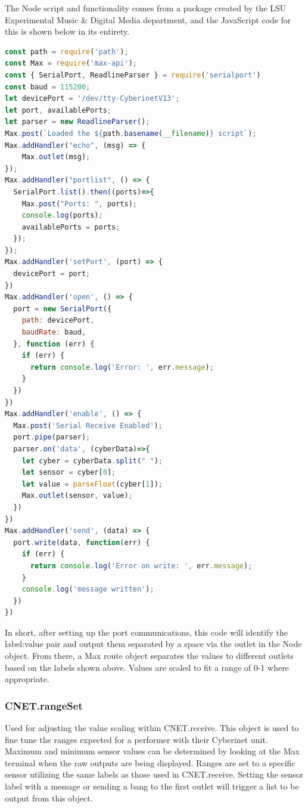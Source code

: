 The Node script and functionality comes from a package created by the LSU Experimental Music \& Digital Media department, and the JavaScript code for this is shown below in its entirety.

\begin{lstlisting}[language=JavaScript] 
const path = require('path');
const Max = require('max-api');
const { SerialPort, ReadlineParser } = require('serialport')
const baud = 115200;
let devicePort = '/dev/tty-CyberinetV13';
let port, availablePorts;
let parser = new ReadlineParser();
Max.post(`Loaded the ${path.basename(__filename)} script`);
Max.addHandler("echo", (msg) => {
	Max.outlet(msg);
});
Max.addHandler("portlist", () => {
  SerialPort.list().then((ports)=>{
    Max.post("Ports: ", ports);
    console.log(ports);
    availablePorts = ports;
  });
});
Max.addHandler('setPort', (port) => {
  devicePort = port;
})
Max.addHandler('open', () => {
  port = new SerialPort({
    path: devicePort,
    baudRate: baud,
  }, function (err) {
    if (err) {
      return console.log('Error: ', err.message);
    }
  })
})
Max.addHandler('enable', () => {
  Max.post('Serial Receive Enabled');
  port.pipe(parser);
  parser.on('data', (cyberData)=>{
    let cyber = cyberData.split(" ");
    let sensor = cyber[0];
    let value = parseFloat(cyber[1]);
    Max.outlet(sensor, value);
  })
})
Max.addHandler('send', (data) => {
  port.write(data, function(err) {
    if (err) {
      return console.log('Error on write: ', err.message);
    }
    console.log('message written');
  })
})
\end{lstlisting}

In short, after setting up the port communications, this code will identify the label:value pair and output them separated by a space via the outlet in the Node object. From there, a Max route object separates the values to different outlets based on the labels shown above. Values are scaled to fit a range of 0-1 where appropriate.

\subsubsection{CNET.rangeSet}
Used for adjusting the value scaling within CNET.receive. This object is used to fine tune the ranges expected for a performer with their Cyberinet unit. Maximum and minimum sensor values can be determined by looking at the Max terminal when the raw outputs are being displayed. Ranges are set to a specific sensor utilizing the same labels as those used in CNET.receive. Setting the sensor label with a message or sending a bang to the first outlet will trigger a list to be output from this object.

